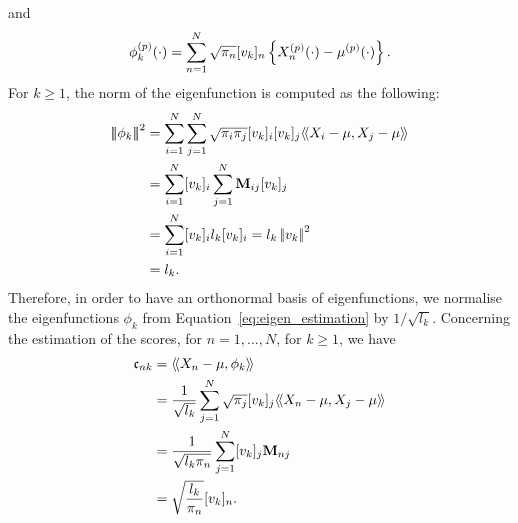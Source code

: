 and
\begin{equation}\label{eq:eigen_estimation}
\phi_k^{(p)}(\cdot) = \sum_{n = 1}^N \sqrt{\pi_n}[v_{k}]_n \left\{\Xnp(\cdot) - \mu^{(p)}(\cdot)\right\}.
\end{equation}
For $k \geq 1$, the norm of the eigenfunction is computed as the following:
\begin{align*}
\normH{\phi_k}^2 &= \sum_{i = 1}^N \sum_{j = 1}^N \sqrt{\pi_i\pi_j}[v_{k}]_i [v_{k}]_j\inH{X_i - \mu}{X_j - \mu} \\
    &= \sum_{i = 1}^N [v_{k}]_i \sum_{j = 1}^N \mathbf{M}_{ij} [v_{k}]_j \\
    &= \sum_{i = 1}^N [v_{k}]_i l_k [v_{k}]_i = l_k \normLp{v_k}^2 \\
    &= l_k. \\
\end{align*}
Therefore, in order to have an orthonormal basis of eigenfunctions, we normalise the eigenfunctions $\phi_k$ from Equation~\eqref{eq:eigen_estimation} by $1 / \sqrt{l_k}$.
Concerning the estimation of the scores, for $n = 1, \dots, N$, for $k \geq 1$, we have
\begin{align}
    \mathfrak{c}_{nk} &= \inH{X_n - \mu}{\phi_k} \\
    &= \frac{1}{\sqrt{l_k}}\sum_{j = 1}^N \sqrt{\pi_j}[v_{k}]_j \inH{X_n - \mu}{X_j - \mu}\\
    &= \frac{1}{\sqrt{l_k\pi_n}}\sum_{j = 1}^N [v_{k}]_j \mathbf{M}_{nj} \\
    &= \sqrt{\frac{l_k}{\pi_n}}[v_{k}]_n.\\
\end{align}

